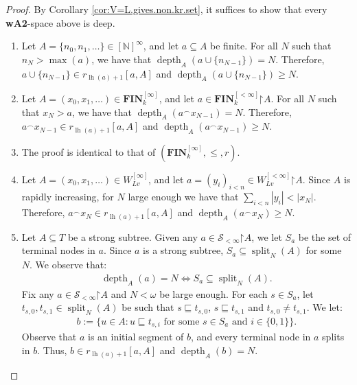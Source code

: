 \documentclass[11pt,reqno]{amsart}
\theoremstyle{plain}
\numberwithin{equation}{section}
\theoremstyle{definition}
\newcommand{\func}{\operatorname}
\newcommand{\N}{\mathbb{N}}
\renewcommand{\bf}{\mathbf}
\newcommand{\restrictedto}{\mathord{\upharpoonright}}
\newcommand{\FIN}{\bf{FIN}}
\newcommand{\lh}{\func{lh}}
\newcommand{\depth}{\func{depth}}
\renewcommand{\S}{\mathcal{S}}
\begin{document}
\begin{proof}
    By Corollary \ref{cor:V=L.gives.non.kr.set}, it suffices to show that every \textbf{wA2}-space above is deep.
    \begin{enumerate}
        \item Let $A = \{n_0,n_1,\dots\} \in [\N]^\infty$, and let $a \subseteq A$ be finite. For all $N$ such that $n_N > \max(a)$, we have that $\depth_A(a \cup \{n_{N-1}\}) = N$. Therefore, $a \cup \{n_{N-1}\} \in r_{\lh(a)+1}[a,A]$ and $\depth_A(a \cup \{n_{N-1}\}) \geq N$.
        
        \item Let $A = (x_0,x_1,\dots) \in \FIN_k^{[\infty]}$, and let $a \in \FIN_k^{[<\infty]}\restrictedto A$. For all $N$ such that $x_N > a$, we have that $\depth_A(a^\frown x_{N-1}) = N$. Therefore, $a^\frown x_{N-1} \in r_{\lh(a)+1}[a,A]$ and $\depth_A(a^\frown x_{N-1}) \geq N$.
        
        \item The proof is identical to that of $(\FIN_k^{[\infty]},\leq,r)$.
        
        \item Let $A = (x_0,x_1,\dots) \in W_{Lv}^{[\infty]}$, and let $a = (y_i)_{i<n} \in W_{Lv}^{[<\infty]}\restrictedto A$. Since $A$ is rapidly increasing, for $N$ large enough we have that $\sum_{i<n} |y_i| < |x_N|$. Therefore, $a^\frown x_N \in r_{\lh(a)+1}[a,A]$ and $\depth_A(a^\frown x_N) \geq N$.
        
        \item Let $A \subseteq T$ be a strong subtree. Given any $a \in \S_{<\infty}\restrictedto A$, we let $S_a$ be the set of terminal nodes in $a$. Since $a$ is a strong subtree, $S_a \subseteq \func{split}_N(A)$ for some $N$. We observe that:
        \begin{align*}
            \depth_A(a) = N \iff S_a \subseteq \func{split}_N(A).
        \end{align*}
        Fix any $a \in \S_{<\infty}\restrictedto A$ and $N < \omega$ be large enough. For each $s \in S_a$, let $t_{s,0},t_{s,1} \in \func{split}_N(A)$ be such that $s \sqsubseteq t_{s,0}$, $s \sqsubseteq t_{s,1}$ and $t_{s,0} \neq t_{s,1}$. We let:
        \begin{align*}
            b := \{u \in A : u \sqsubseteq t_{s,i} \text{ for some $s \in S_a$ and $i \in \{0,1\}$}\}.
        \end{align*}
        Observe that $a$ is an initial segment of $b$, and every terminal node in $a$ splits in $b$. Thus, $b \in r_{\lh(a)+1}[a,A]$ and $\depth_A(b) = N$.


\end{enumerate}
\end{proof}
\end{document}

